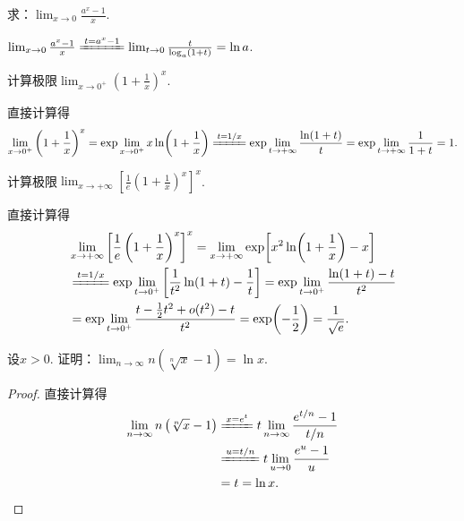 \begin{example}
求：\(\lim_{x\to0} \frac{a^x - 1}{x}\).
\begin{solution}
\(\lim_{x\to0} \frac{a^x - 1}{x}
\xlongequal{t=a^x-1} \lim_{t\to0}\frac{t}{\log_a (1+t)}
= \ln a\).
\end{solution}
\end{example}

\begin{example}
计算极限\(\lim_{x\to0^+} \left(1+\frac1x\right)^x\).
\begin{solution}
直接计算得\[
	\lim_{x\to0^+} \left(1+\frac1x\right)^x
	= \exp\lim_{x\to0^+} x\ln(1+\frac1x) %
	\xlongequal{t=1/x} \exp\lim_{t\to+\infty} \frac{\ln(1+t)}{t} %
	= \exp\lim_{t\to+\infty} \frac1{1+t} %
	= 1.
\]
\end{solution}
\end{example}

\begin{example}
计算极限\(\lim_{x\to+\infty} \left[ \frac1e \left(1+\frac1x\right)^x \right]^x\).
\begin{solution}
直接计算得\begin{align*}
	&\lim_{x\to+\infty} \left[ \frac1e \left(1+\frac1x\right)^x \right]^x
	= \lim_{x\to+\infty} \exp[x^2 \ln(1+\frac1x) - x] \\
	&\xlongequal{t=1/x} \exp\lim_{t\to0^+} \left[ \frac1{t^2} \ln(1+t) - \frac1t \right]
	= \exp\lim_{t\to0^+} \frac{\ln(1+t)-t}{t^2} \\
	&= \exp\lim_{t\to0^+} \frac{t-\frac12t^2+o(t^2)-t}{t^2}
	= \exp(-\frac12)
	= \frac1{\sqrt{e}}.
\end{align*}
\end{solution}
\end{example}

\begin{example}
设\(x>0\).
证明：\(\lim_{n\to\infty} n \left( \sqrt[n]{x} - 1 \right) = \ln x\).
\begin{proof}
直接计算得\begin{align*}
	\lim_{n\to\infty} n \left( \sqrt[n]{x} - 1 \right)
	&\xlongequal{x = e^t} t \lim_{n\to\infty} \frac{e^{t/n} - 1}{t/n} \\
	&\xlongequal{u=t/n} t \lim_{u\to0} \frac{e^u - 1}u \\
	&= t
	= \ln x.
	\qedhere
\end{align*}
\end{proof}
\end{example}

